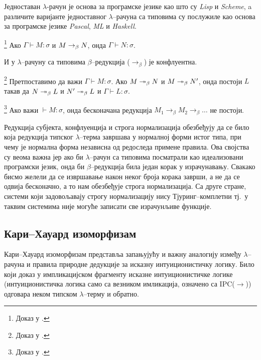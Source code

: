 Једноставан $\lambda$-рачун је основа за програмске језике као што су
\emph{Lisp} и \emph{Scheme}, a различите варијанте једноставног
$\lambda$--рачуна са типовима су послужиле као основа за програмске
језике \emph{Pascal}, \emph{ML} и \emph{Haskell}.

\begin{theorem} \footnote{Доказ у \cite{barendregt2013lambda}.} 
Ако $\Gamma \vdash M : \sigma$ и $M \rightarrow_{\beta} N$, онда $\Gamma \vdash
N: \sigma$.
\end{theorem}

И у $\lambda$--рачуну са типовима $\beta$--редукција ($\to_{\beta}$)
је конфлуентна.

\begin{theorem}[Конфлуентност] \footnote{Доказ у \cite{barendregt2013lambda}.} 
Претпоставимо да важи $\Gamma \vdash M : \sigma$. Ако $M \twoheadrightarrow_{\beta}
N$ и $M \twoheadrightarrow_{\beta} N'$, онда постоји $L$ такав да $N \twoheadrightarrow_{\beta} L$
и $N' \twoheadrightarrow_{\beta} L$ и $\Gamma \vdash L:\sigma$.
\end{theorem}

\begin{theorem} \footnote{Доказ у \cite{barendregt2013lambda}.} 
Ако важи $\vdash M : \sigma$, онда бесконачана редукција $M_1
\to_{\beta} M_2 \to_{\beta} \ldots$ не постоји.
\end{theorem}

Редукција субјекта, конфлуенција и строга нормализација обезбеђују да
се било која редукција типског $\lambda$--терма завршава у нормалној
форми истог типа, при чему је нормална форма независна од редоследа
примене правила. Ова својства су веома важна јер ако би
$\lambda$--рачун са типовима посматрали као идеализовани програмски
језик, онда би $\beta$--редукција била један корак у
израчунавању. Свакако бисмо желели да се извршавање након неког броја
корака заврши, а не да се одвија бесконачно, а то нам обезбеђује
строга нормализација. Са друге стране, системи који задовољавају
строгу нормализацију нису Тјуринг--комплетни тј.~у таквим системима
није могуће записати све израчунљиве функције.

\subsection{Кари--Хауард изоморфизам}

Кари--Хауард изоморфизам представља запањујућу и важну аналогију
између $\lambda$--рачуна и правила природне дедукције за исказну
интуиционистичку логику. Било који доказ у импликацијском фрагменту
исказне интуиционистичке логике (интуиционистичка логика само са
везником имликација, означено са IPC($\to$)) одговара неком типском
$\lambda$--терму и обратно.

